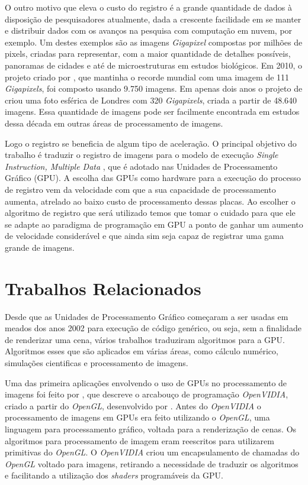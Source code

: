 	O outro motivo que eleva o custo do registro é a grande quantidade de dados à disposição de pesquisadores atualmente,
dada a crescente facilidade em se manter e distribuir dados com os avanços na pesquisa com computação em nuvem, por exemplo.
Um destes exemplos são as imagens \textit{Gigapixel} \cite{cossairt2011gigapixel} compostas por milhões de pixels, criadas para 
representar, com a maior quantidade de detalhes possíveis, panoramas de cidades e até de microestruturas em 
estudos biológicos. Em 2010, o projeto criado por \cite{sevilla111}, que mantinha o recorde mundial com uma imagem de 111 
\textit{Gigapixels}, foi composto usando 9.750 imagens. Em apenas dois anos o projeto de \cite{london320} criou uma foto
esférica de Londres com 320 \textit{Gigapixels}, criada a partir de 48.640 imagens. Essa quantidade de imagens pode ser
facilmente encontrada em estudos dessa década em outras áreas de processamento de imagens.

	Logo o registro se beneficia de algum tipo de aceleração. O principal objetivo do trabalho é traduzir o registro de 
imagens para o modelo de execução \textit{Single Instruction, Multiple Data} \cite{patterson2013computer}, que é adotado 
nas Unidades de Processamento Gráfico (GPU). A escolha das GPUs como hardware para a execução do processo de registro vem da 
velocidade com que a sua capacidade de processamento aumenta, atrelado ao baixo custo de processamento dessas placas. Ao
escolher o algoritmo de registro que será utilizado temos que tomar o cuidado para que ele se adapte ao paradigma de 
programação em GPU a ponto de ganhar um aumento de velocidade considerável e que ainda sim seja capaz de registrar uma 
gama grande de imagens.

\section{Trabalhos Relacionados}
\label{sec:objetivo}
	Desde que as Unidades de Processamento Gráfico começaram a ser usadas em meados dos anos 2002 para execução de 
código genérico, ou seja, sem a finalidade de renderizar uma cena, vários trabalhos traduziram algoritmos para a GPU.
Algoritmos esses que são aplicados em várias áreas, como cálculo numérico, simulações cientificas e processamento de 
imagens.

	Uma das primeira aplicações envolvendo o uso de GPUs no processamento de imagens foi feito por 
\cite{fung2005openvidia}, que descreve o arcabouço de programação \textit{OpenVIDIA}, criado a partir do 
\textit{OpenGL}, desenvolvido por \cite{opengl}. Antes do \textit{OpenVIDIA} o processamento de imagens em GPUs era
feito utilizando o \textit{OpenGL}, uma linguagem para processamento gráfico, voltada para a renderização de cenas. Os
algoritmos para processamento de imagem eram reescritos para utilizarem primitivas do \textit{OpenGL}. O 
\textit{OpenVIDIA} criou um encapsulamento de chamadas do \textit{OpenGL} voltado para imagens, retirando a necessidade
de traduzir os algoritmos e facilitando a utilização dos \textit{shaders} programáveis da GPU.

